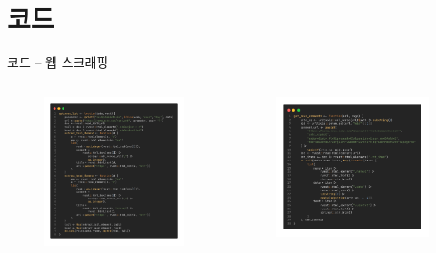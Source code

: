 \documentclass[mathserif, aspectratio=169]{beamer}
\begin{document}
\section{코드}
\begin{frame}{코드 -- 웹 스크래핑}
    \begin{columns}
        \begin{column}{0.5\linewidth}
            \centering
            \begin{figure}
                \includegraphics[scale = 0.12]{images/codes/get_news_list.png}
            \end{figure}
        \end{column}
        \begin{column}{0.5\linewidth}
            \centering
            \begin{figure}
                \includegraphics[scale = 0.12]{images/codes/get_news_comments.png}

\end{figure}
\end{column}
\end{columns}
\end{frame}
\end{document}
